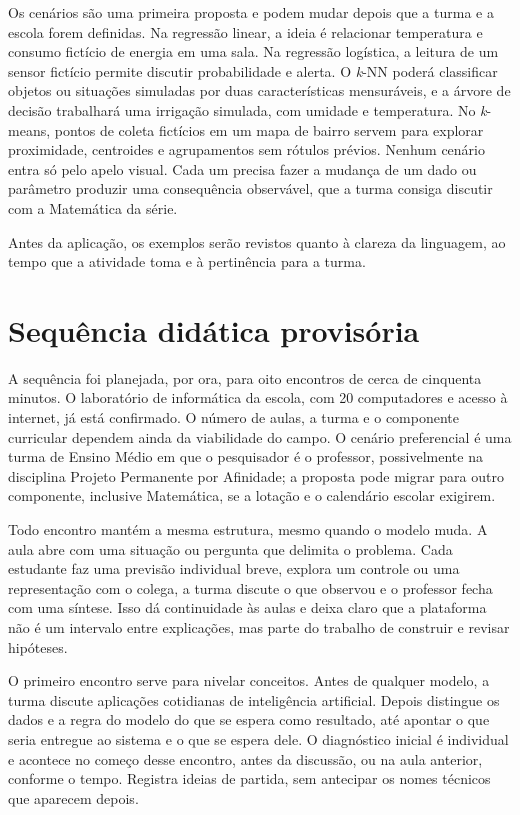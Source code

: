 Os cenários são uma primeira proposta e podem mudar depois que a turma e a escola forem definidas. Na regressão linear, a ideia é relacionar temperatura e consumo fictício de energia em uma sala. Na regressão logística, a leitura de um sensor fictício permite discutir probabilidade e alerta. O \textit{k}-NN poderá classificar objetos ou situações simuladas por duas características mensuráveis, e a árvore de decisão trabalhará uma irrigação simulada, com umidade e temperatura. No \textit{k}-means, pontos de coleta fictícios em um mapa de bairro servem para explorar proximidade, centroides e agrupamentos sem rótulos prévios. Nenhum cenário entra só pelo apelo visual. Cada um precisa fazer a mudança de um dado ou parâmetro produzir uma consequência observável, que a turma consiga discutir com a Matemática da série.

Antes da aplicação, os exemplos serão revistos quanto à clareza da linguagem, ao tempo que a atividade toma e à pertinência para a turma.

\section{Sequência didática provisória}

A sequência foi planejada, por ora, para oito encontros de cerca de cinquenta minutos. O laboratório de informática da escola, com 20 computadores e acesso à internet, já está confirmado. O número de aulas, a turma e o componente curricular dependem ainda da viabilidade do campo. O cenário preferencial é uma turma de Ensino Médio em que o pesquisador é o professor, possivelmente na disciplina Projeto Permanente por Afinidade; a proposta pode migrar para outro componente, inclusive Matemática, se a lotação e o calendário escolar exigirem.

Todo encontro mantém a mesma estrutura, mesmo quando o modelo muda. A aula abre com uma situação ou pergunta que delimita o problema. Cada estudante faz uma previsão individual breve, explora um controle ou uma representação com o colega, a turma discute o que observou e o professor fecha com uma síntese. Isso dá continuidade às aulas e deixa claro que a plataforma não é um intervalo entre explicações, mas parte do trabalho de construir e revisar hipóteses.

O primeiro encontro serve para nivelar conceitos. Antes de qualquer modelo, a turma discute aplicações cotidianas de inteligência artificial. Depois distingue os dados e a regra do modelo do que se espera como resultado, até apontar o que seria entregue ao sistema e o que se espera dele. O diagnóstico inicial é individual e acontece no começo desse encontro, antes da discussão, ou na aula anterior, conforme o tempo. Registra ideias de partida, sem antecipar os nomes técnicos que aparecem depois.

